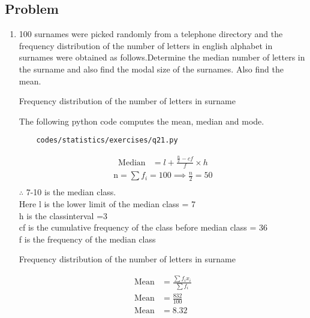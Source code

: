 \subsection{Problem}

\renewcommand{\theequation}{\theenumi}
\begin{enumerate}[label=\thesection.\arabic*.,ref=\thesection.\theenumi]
	\item  100 surnames were picked randomly from a telephone directory and the frequency distribution of the number of letters in english alphabet in surnames were obtained as follows.Determine the median number of letters in the surname and also find the modal size of the surnames. Also find the mean.\\
	
		\begin{table}[ht]
	\begin{center}
    	
	\caption{Frequency distribution of the number of letters in surname}
	\label{table:table10}
	\end{center}
	\end{table}
	
	
	
	\solution  The following python code computes the mean, median and mode.
	\begin{lstlisting}
	codes/statistics/exercises/q21.py
	\end{lstlisting}
	
	\begin{align}
	\text{Median} &= l + \frac{\frac{n}{2} -cf}{f}\times h
	\end{align}
	\begin{align}
	\text{n} = \sum f_{i} = 100 \implies \frac{n}{2} = 50\\
	\end{align}
	$\therefore$ 7-10 is the median class.\\
	Here l is the lower limit of the median class = 7\\
	h is the classinterval =3\\
	cf is the cumulative frequency of the class before median class = 36\\
	f is the frequency of the median class



	\begin{table}[ht]
	\begin{center}
    	
	\caption{Frequency distribution of the number of letters in surname}
	\label{table:table10}
	\end{center}
	\end{table}
	\begin{align}
	\text{Mean} &= \frac{\sum f_ix_i}{\sum f_i}\\
	\text{Mean} &= \frac{832}{100}\\
	\text{Mean} &= 8.32
	\end{align}


\end{enumerate}

